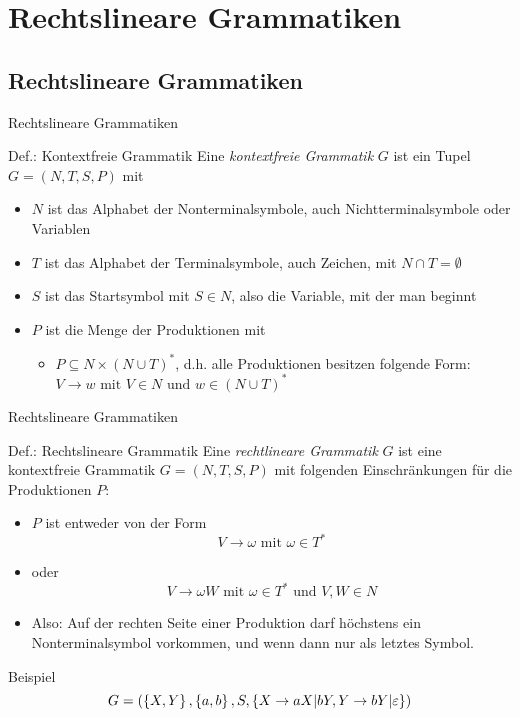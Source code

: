 \section{Rechtslineare Grammatiken}
\subsection{Rechtslineare Grammatiken}

\begin{frame}{Rechtslineare Grammatiken}
\begin{block}{Def.: Kontextfreie Grammatik}
	Eine \emph{kontextfreie Grammatik} $G$ ist ein Tupel $G = (N,T,S,P)$ mit
	\begin{itemize}
		\item $N$ ist das Alphabet der Nonterminalsymbole, auch Nichtterminalsymbole oder Variablen
		\item $T$ ist das Alphabet der Terminalsymbole, auch Zeichen, mit $N \cap T = \emptyset$
		\item $S$ ist das Startsymbol mit $S \in N$, also die Variable, mit der man beginnt
		\item $P$ ist die Menge der Produktionen mit
			\begin{itemize}
				\item $P \subseteq N \times (N \cup T)^*$, d.h. alle Produktionen besitzen folgende Form:\\
				$V \to w \text{ mit } V \in N \text{ und } w \in (N \cup T)^*$
			\end{itemize}
	\end{itemize}
\end{block}
\end{frame}

\begin{frame}{Rechtslineare Grammatiken}
\begin{block}{Def.: Rechtslineare Grammatik}
	Eine \emph{rechtlineare Grammatik} $G$ ist eine kontextfreie Grammatik $G = (N,T,S,P)$ mit folgenden Einschränkungen für die Produktionen $P$:\\
	\begin{itemize}
			\item $P$ ist entweder von der Form \[
		V \to \omega \text{ mit } \omega \in T^*
	\]
	\item oder \[
		V \to \omega W \text{ mit } \omega \in T^* \text{ und } V,W \in N
	\]
	\item Also: Auf der rechten Seite einer Produktion darf höchstens ein Nonterminalsymbol vorkommen, und wenn dann nur als letztes Symbol.
	\end{itemize}
\end{block}
\pause
\begin{exampleblock}{Beispiel}
	\[
		G = (\left\{ X,Y \right\}, \left\{ a,b \right\}, S, \left\{ X \to aX | bY, Y \to bY | \varepsilon \right\})
	\]
\end{exampleblock}
\end{frame}

